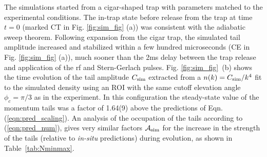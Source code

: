 	The simulations started from a cigar-shaped trap with parameters matched to the experimental conditions. 
	The in-trap state before release from the trap at time $t=0$ (marked CT in Fig. \ref{fig:sim_fig} (a)) was consistent with the adiabatic sweep theorem. 
	Following expansion from the cigar trap, the simulated tail amplitude increased and stabilized within a few hundred microseconds (CE in Fig. \ref{fig:sim_fig} (a)), much sooner than the 2ms delay between the trap release and application of the rf and Stern-Gerlach pulses. 
	Fig. \ref{fig:sim_fig}~(b) shows the time evolution of the tail amplitude {$C_{\rm sim}$ extracted from a $n(k)=C_{\rm sim}/k^4$ fit to the simulated density} %
	using {an ROI with the same cutoff elevation angle $\phi_c=\pi/3$ as in the experiment.}  
	In this configuration the steady-state value of the momentum tails was a factor of 1.64(9) above the predictions of Eqn. (\ref{eqn:pred_scaling}). 
	{An analysis of the occupation of the tails according to (\ref{eqn:pred_num}), gives very similar factors $\mathcal{A}_{\rm sim}$ for the increase in the strength of the tails (relative to \emph{in-situ} predictions) during evolution, as shown in Table~\ref{tab:Nminmax}.}

